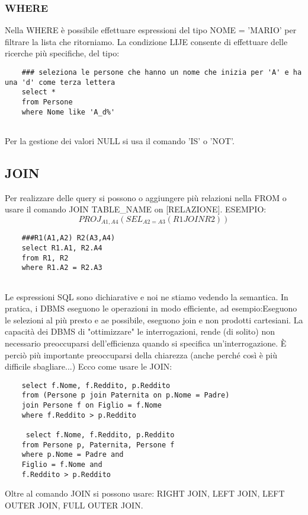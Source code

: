 \documentclass{article}
\begin{document}
\subsubsection{WHERE}
Nella WHERE è possibile effettuare espressioni del tipo NOME = 'MARIO' per filtrare la lista che ritorniamo. La condizione LIJE consente di effettuare delle ricerche più specifiche, del tipo:
\begin{center}
\centering
    \begin{lstlisting}
    ### seleziona le persone che hanno un nome che inizia per 'A' e ha una 'd' come terza lettera
    select *
    from Persone
    where Nome like 'A_d%'
        
    \end{lstlisting}
\end{center}
Per la gestione dei valori NULL si usa il comando 'IS' o 'NOT'.

\subsection{JOIN}
Per realizzare delle query si possono o aggiungere più relazioni nella FROM o usare il comando JOIN TABLE\_NAME on [RELAZIONE].
ESEMPIO:
\[PROJ_{A1,A4} (SEL_{A2=A3} (R1 JOIN R2))\]
\begin{center}
\centering
    \begin{lstlisting}
    ###R1(A1,A2) R2(A3,A4) 
    select R1.A1, R2.A4
    from R1, R2
    where R1.A2 = R2.A3
        
    \end{lstlisting}
\end{center}

Le espressioni SQL sono dichiarative e noi ne stiamo vedendo la semantica.
In pratica, i DBMS eseguono le operazioni in modo
efficiente, ad esempio:Eseguono le selezioni al più presto e ae possibile, eseguono join e non prodotti cartesiani.
La capacità dei DBMS di "ottimizzare" le interrogazioni, rende (di solito) non necessario preoccuparsi dell'efficienza quando si specifica un'interrogazione.
È perciò più importante preoccuparsi della chiarezza (anche perché così è più difficile sbagliare...)
Ecco come usare le JOIN:
\begin{center}
\centering
    \begin{lstlisting}
    select f.Nome, f.Reddito, p.Reddito
    from (Persone p join Paternita on p.Nome = Padre)
    join Persone f on Figlio = f.Nome
    where f.Reddito > p.Reddito

     select f.Nome, f.Reddito, p.Reddito
    from Persone p, Paternita, Persone f
    where p.Nome = Padre and
    Figlio = f.Nome and
    f.Reddito > p.Reddito
    \end{lstlisting}
\end{center}
Oltre al comando JOIN si possono usare: RIGHT JOIN, LEFT JOIN, LEFT OUTER JOIN, FULL OUTER JOIN.
\end{document}
